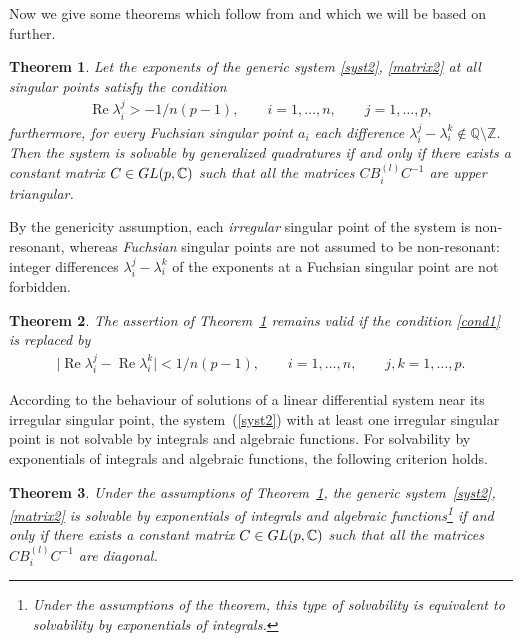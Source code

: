 \documentclass[11pt]{article}
\numberwithin{equation}{section}
\newtheorem{Theorem}{Theorem}[section]
\begin{document}
Now we give some theorems which follow from \cite{Go, GV} and which we will be based on further.

\begin{Theorem}\label{theorem1}Let the exponents of the generic system \eqref{syst2}, \eqref{matrix2} at all singular points satisfy the condition
\begin{gather}\label{cond1}
\operatorname{Re}\lambda_i^j>-1/n(p-1), \qquad i=1,\ldots,n, \qquad j=1,\ldots,p,
\end{gather}
furthermore, for every Fuchsian singular point $a_i$ each difference $\lambda_i^j-\lambda_i^k\not\in{\mathbb Q} \setminus{\mathbb Z}$. Then the system is solvable by generalized quadratures if and only if there exists a constant matrix $C\in{\rm GL}(p,\mathbb C)$ such that all the matrices $CB_i^{(l)}C^{-1}$ are upper triangular.
\end{Theorem}

\begin{Remark} By the genericity assumption, each {\it irregular} singular point of the system is non-resonant, whereas
{\it Fuchsian} singular points are not assumed to be non-resonant: integer differences $\lambda_i^j-\lambda_i^k$ of the
exponents at a Fuchsian singular point are not forbidden.
\end{Remark}

\begin{Theorem}\label{theorem1'}
The assertion of Theorem~{\rm \ref{theorem1}} remains valid if the condition \eqref{cond1} is replaced by
\begin{gather*}%
\bigl|\operatorname{Re}\lambda_i^j-\operatorname{Re}\lambda_i^k\bigr|<1/n(p-1), \qquad i=1,\ldots,n, \qquad j,k=1,\ldots,p.
\end{gather*}
\end{Theorem}

According to the behaviour of solutions of a linear differential system near its irregular singular point, the system~(\ref{syst2}) with at least one irregular singular point is not solvable by integrals and algebraic functions.
For solvability by exponentials of integrals and algebraic functions, the following criterion holds.

\begin{Theorem}\label{theorem2}
Under the assumptions of Theorem~{\rm \ref{theorem1}}, the generic system~\eqref{syst2}, \eqref{matrix2} is solvable by exponentials of integrals and algebraic functions\footnote{Under the assumptions of the theorem, this type of solvability is equivalent to solvability by exponentials of integrals.} if and only if there exists a constant matrix $C\in{\rm GL}(p,\mathbb C)$ such that all the matrices $CB_i^{(l)}C^{-1}$ are diagonal.
\end{Theorem}
\end{document}
